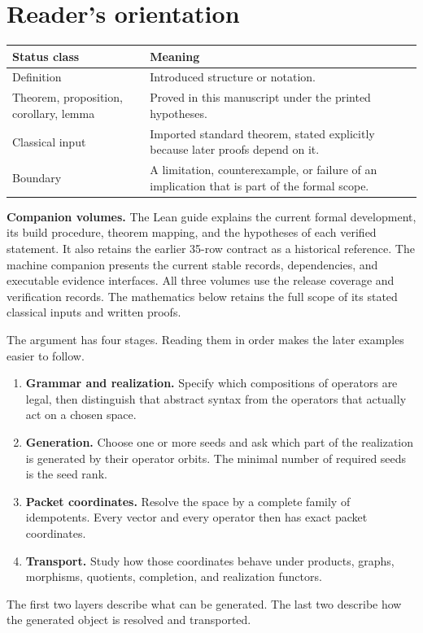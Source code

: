 \section*{Reader's orientation}
\begin{center}
\begin{tabularx}{0.96\textwidth}{@{}lY@{}}
\toprule
\textbf{Status class} & \textbf{Meaning}\\
\midrule
Definition & Introduced structure or notation.\\
Theorem, proposition, corollary, lemma & Proved in this manuscript under the printed hypotheses.\\
Classical input & Imported standard theorem, stated explicitly because later proofs depend on it.\\
Boundary & A limitation, counterexample, or failure of an implication that is part of the formal scope.\\
\bottomrule
\end{tabularx}
\end{center}

\noindent\textbf{Companion volumes.} The Lean guide explains the current formal development, its build procedure, theorem mapping, and the hypotheses of each verified statement. It also retains the earlier 35-row contract as a historical reference. The machine companion presents the current stable records, dependencies, and executable evidence interfaces. All three volumes use the release coverage and verification records. The mathematics below retains the full scope of its stated classical inputs and written proofs.


\begin{readerroadmap}
The argument has four stages. Reading them in order makes the later examples easier to follow.
\begin{enumerate}
\item \textbf{Grammar and realization.}  Specify which compositions of operators are legal, then distinguish that abstract syntax from the operators that actually act on a chosen space.
\item \textbf{Generation.}  Choose one or more seeds and ask which part of the realization is generated by their operator orbits.  The minimal number of required seeds is the seed rank.
\item \textbf{Packet coordinates.}  Resolve the space by a complete family of idempotents.  Every vector and every operator then has exact packet coordinates.
\item \textbf{Transport.}  Study how those coordinates behave under products, graphs, morphisms, quotients, completion, and realization functors.
\end{enumerate}
The first two layers describe what can be generated.  The last two describe how the generated object is resolved and transported.
\end{readerroadmap}

